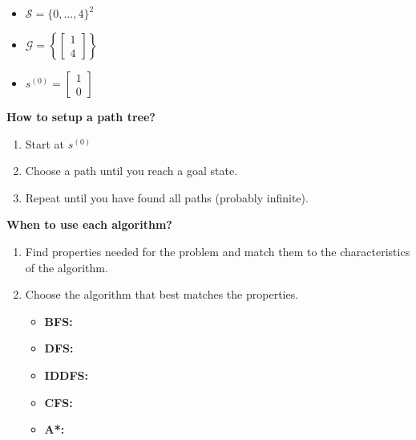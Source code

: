 \begin{example}
\end{example}
\newpage

\begin{example}
    \begin{itemize}
        \item $\mathcal{S} = \{0,\ldots,4 \}^2$
        \item $\mathcal{G} = \left\{ \begin{bmatrix}
            1 \\
            4
        \end{bmatrix} \right\}$
        \item $s^{(0)} = \begin{bmatrix}
            1 \\
            0
        \end{bmatrix}$
    \end{itemize}
\end{example}
\newpage


\begin{process} \textbf{How to setup a path tree?}
    \begin{enumerate}
        \item Start at $s^{(0)}$
        \item Choose a path until you reach a goal state.
        \item Repeat until you have found all paths (probably infinite).
    \end{enumerate}
\end{process}

\begin{example}
\end{example}

\newpage

\begin{process} \textbf{When to use each algorithm?}
    \begin{enumerate}
        \item Find properties needed for the problem and match them to the characteristics of the algorithm.
        \item Choose the algorithm that best matches the properties.
        \begin{itemize}
            \item \textbf{BFS:} 
            \item \textbf{DFS:} 
            \item \textbf{IDDFS:} 
            \item \textbf{CFS:}
            \item \textbf{A*:} 
        \end{itemize}
    \end{enumerate}
\end{process}

